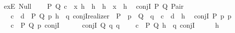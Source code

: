 \begin{isabellebody}
\isanewline
\ \ exE{\isacharcolon}{\kern0pt}\ {\isachardoublequoteopen}Null{\isachardoublequoteclose}\isanewline
\ \ \ \ {\isachardoublequoteopen}\isactrlbold {\isasymlambda}P\ Q\ {\isacharparenleft}{\kern0pt}c{\isacharcolon}{\kern0pt}\ {\isacharunderscore}{\kern0pt}{\isacharparenright}{\kern0pt}\ x\ {\isacharparenleft}{\kern0pt}h{}{\isacharcolon}{\kern0pt}\ {\isacharunderscore}{\kern0pt}{\isacharparenright}{\kern0pt}\ {\isacharparenleft}{\kern0pt}h{}{\isacharcolon}{\kern0pt}\ {\isacharunderscore}{\kern0pt}{\isacharparenright}{\kern0pt}{\isachardot}{\kern0pt}\ h{}\ {\isasymcdot}\ x\ {\isasymbullet}\ h{}{\isachardoublequoteclose}\isanewline
\isanewline
\ \ conjI\ {\isacharparenleft}{\kern0pt}P{\isacharcomma}{\kern0pt}\ Q{\isacharparenright}{\kern0pt}{\isacharcolon}{\kern0pt}\ {\isachardoublequoteopen}Pair{\isachardoublequoteclose}\isanewline
\ \ \ \ {\isachardoublequoteopen}\isactrlbold {\isasymlambda}{\isacharparenleft}{\kern0pt}c{\isacharcolon}{\kern0pt}\ {\isacharunderscore}{\kern0pt}{\isacharparenright}{\kern0pt}\ {\isacharparenleft}{\kern0pt}d{\isacharcolon}{\kern0pt}\ {\isacharunderscore}{\kern0pt}{\isacharparenright}{\kern0pt}\ P\ Q\ p\ {\isacharparenleft}{\kern0pt}h{\isacharcolon}{\kern0pt}\ {\isacharunderscore}{\kern0pt}{\isacharparenright}{\kern0pt}\ q{\isachardot}{\kern0pt}\ conjI{\isacharunderscore}{\kern0pt}realizer\ {\isasymcdot}\ P\ {\isasymcdot}\ p\ {\isasymcdot}\ Q\ {\isasymcdot}\ q\ {\isasymbullet}\ c\ {\isasymbullet}\ d\ {\isasymbullet}\ h{\isachardoublequoteclose}\isanewline
\isanewline
\ \ conjI\ {\isacharparenleft}{\kern0pt}P{\isacharparenright}{\kern0pt}{\isacharcolon}{\kern0pt}\ {\isachardoublequoteopen}{\isasymlambda}p{\isachardot}{\kern0pt}\ p{\isachardoublequoteclose}\isanewline
\ \ \ \ {\isachardoublequoteopen}\isactrlbold {\isasymlambda}{\isacharparenleft}{\kern0pt}c{\isacharcolon}{\kern0pt}\ {\isacharunderscore}{\kern0pt}{\isacharparenright}{\kern0pt}\ P\ Q\ p{\isachardot}{\kern0pt}\ conjI\ {\isasymcdot}\ {\isacharunderscore}{\kern0pt}\ {\isasymcdot}\ {\isacharunderscore}{\kern0pt}{\isachardoublequoteclose}\isanewline
\isanewline
\ \ conjI\ {\isacharparenleft}{\kern0pt}Q{\isacharparenright}{\kern0pt}{\isacharcolon}{\kern0pt}\ {\isachardoublequoteopen}{\isasymlambda}q{\isachardot}{\kern0pt}\ q{\isachardoublequoteclose}\isanewline
\ \ \ \ {\isachardoublequoteopen}\isactrlbold {\isasymlambda}{\isacharparenleft}{\kern0pt}c{\isacharcolon}{\kern0pt}\ {\isacharunderscore}{\kern0pt}{\isacharparenright}{\kern0pt}\ P\ Q\ {\isacharparenleft}{\kern0pt}h{\isacharcolon}{\kern0pt}\ {\isacharunderscore}{\kern0pt}{\isacharparenright}{\kern0pt}\ q{\isachardot}{\kern0pt}\ conjI\ {\isasymcdot}\ {\isacharunderscore}{\kern0pt}\ {\isasymcdot}\ {\isacharunderscore}{\kern0pt}\ {\isasymbullet}\ h{\isachardoublequoteclose}\isanewline

\end{isabellebody}
